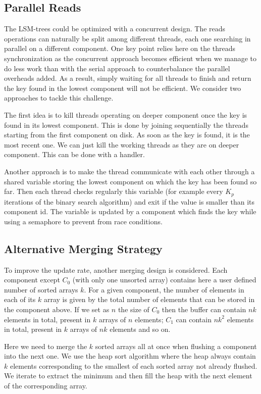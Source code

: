 \documentclass{sig-alternate-05-2015}
\begin{document}
\subsection{Parallel Reads}

The LSM-trees could be optimized with a concurrent design. The reads operations can naturally be split among different threads, each one searching in parallel on a different component. One key point relies here on the threads synchronization as the concurrent approach becomes efficient when we manage to do less work than with the serial approach to counterbalance the parallel overheads added. As a result, simply waiting for all threads to finish and return the key found in the lowest component will not be efficient. We consider two approaches to tackle this challenge.

The first idea is to kill threads operating on deeper component once the key is found in its lowest component. This is done by joining sequentially the threads starting from the first component on disk. As soon as the key is found, it is the most recent one. We can just kill the working threads as they are on deeper component. This can be done with a handler.

Another approach is to make the thread communicate with each other through a shared variable storing the lowest component on which the key has been found so far. Then each thread checks regularly this variable (for example every $K_p$ iterations of the binary search algorithm) and exit if the value is smaller than its component id. The variable is updated by a component which finds the key while using a semaphore to prevent from race conditions.

\subsection{Alternative Merging Strategy}

To improve the update rate, another merging design is considered. Each component except $C_0$ (with only one unsorted array) contains here a user defined number of sorted arrays $k$. For a given component, the number of elements in each of its $k$ array is given by the total number of elements that can be stored in the component above. If we set as $n$ the size of $C_0$ then the buffer can contain $nk$ elements in total, present in $k$ arrays of $n$ elements; $C_1$ can contain $nk^2$ elements in total, present in $k$ arrays of $nk$ elements and so on.

Here we need to merge the $k$ sorted arrays all at once when flushing a component into the next one. We use the heap sort algorithm where the heap always contain $k$ elements corresponding to the smallest of each sorted array not already flushed. We iterate to extract the minimum and then fill the heap with the next element of the corresponding array.
\end{document}

